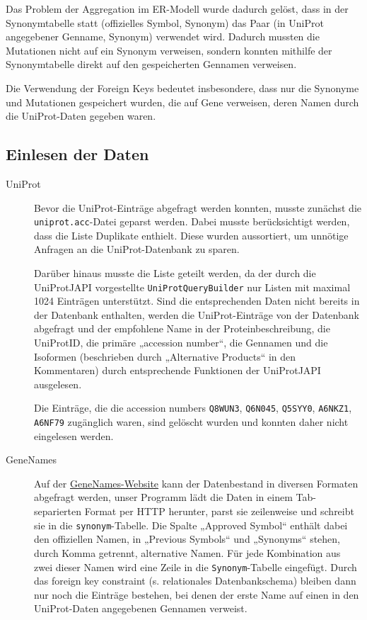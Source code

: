 \documentclass{scrartcl}
\begin{document}
Das Problem der Aggregation im ER-Modell wurde dadurch gelöst, dass in der Synonymtabelle statt (offizielles Symbol, Synonym) das Paar (in UniProt angegebener Genname, Synonym) verwendet wird. Dadurch mussten die Mutationen nicht auf ein Synonym verweisen, sondern konnten mithilfe der Synonymtabelle direkt auf den gespeicherten Gennamen verweisen.

Die Verwendung der Foreign Keys bedeutet insbesondere, dass nur die Synonyme und Mutationen gespeichert wurden, die auf Gene verweisen, deren Namen durch die UniProt-Daten gegeben waren.

\subsection{Einlesen der Daten}

\begin{description}
\item[UniProt]
Bevor die UniProt-Einträge abgefragt werden konnten, musste zunächst die \texttt{uniprot.acc}-Datei geparst werden. Dabei musste berücksichtigt werden, dass die Liste Duplikate enthielt. Diese wurden aussortiert, um unnötige Anfragen an die UniProt-Datenbank zu sparen.

Darüber hinaus musste die Liste geteilt werden, da der durch die UniProtJAPI vorgestellte \texttt{UniProtQueryBuilder} nur Listen mit maximal 1024 Einträgen unterstützt. Sind die entsprechenden Daten nicht bereits in der Datenbank enthalten, werden die UniProt-Einträge von der Datenbank abgefragt und der empfohlene Name in der Proteinbeschreibung, die UniProtID, die primäre „accession number“, die Gennamen und die Isoformen (beschrieben durch „Alternative Products“ in den Kommentaren) durch entsprechende Funktionen der UniProtJAPI ausgelesen.

Die Einträge, die die accession numbers \texttt{Q8WUN3}, \texttt{Q6N045}, \texttt{Q5SYY0}, \texttt{A6NKZ1}, \texttt{A6NF79} zugänglich waren, sind gelöscht wurden und konnten daher nicht eingelesen werden.

\item[GeneNames]
Auf der \href{http://genenames.org/}{GeneNames-Website} kann der Datenbestand in diversen Formaten abgefragt werden, unser Programm lädt die Daten in einem Tab-separierten Format per HTTP herunter, parst sie zeilenweise und schreibt sie in die \texttt{synonym}-Tabelle. Die Spalte „Approved Symbol“ enthält dabei den offiziellen Namen, in „Previous Symbols“ und „Synonyms“ stehen, durch Komma getrennt, alternative Namen. Für jede Kombination aus zwei dieser Namen wird eine Zeile in die \texttt{Synonym}-Tabelle eingefügt. Durch das foreign key constraint (s. relationales Datenbankschema) bleiben dann nur noch die Einträge bestehen, bei denen der erste Name auf einen in den UniProt-Daten angegebenen Gennamen verweist.


\end{description}
\end{document}
